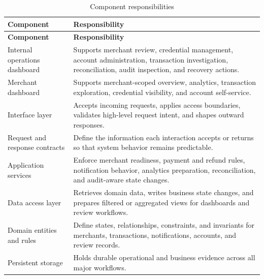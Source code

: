 \begin{longtable}{L{0.26\textwidth}L{0.64\textwidth}}
\caption{Component responsibilities}\\
\toprule
\textbf{Component} & \textbf{Responsibility} \\
\midrule
\endfirsthead
\toprule
\textbf{Component} & \textbf{Responsibility} \\
\midrule
\endhead
Internal operations dashboard & Supports merchant review, credential management, account administration, transaction investigation, reconciliation, audit inspection, and recovery actions. \\
\bodyrowrule
Merchant dashboard & Supports merchant-scoped overview, analytics, transaction exploration, credential visibility, and account self-service. \\
\bodyrowrule
Interface layer & Accepts incoming requests, applies access boundaries, validates high-level request intent, and shapes outward responses. \\
\bodyrowrule
Request and response contracts & Define the information each interaction accepts or returns so that system behavior remains predictable. \\
\bodyrowrule
Application services & Enforce merchant readiness, payment and refund rules, notification behavior, analytics preparation, reconciliation, and audit-aware state changes. \\
\bodyrowrule
Data access layer & Retrieves domain data, writes business state changes, and prepares filtered or aggregated views for dashboards and review workflows. \\
\bodyrowrule
Domain entities and rules & Define states, relationships, constraints, and invariants for merchants, transactions, notifications, accounts, and review records. \\
\bodyrowrule
Persistent storage & Holds durable operational and business evidence across all major workflows. \\
\bottomrule
\end{longtable}

